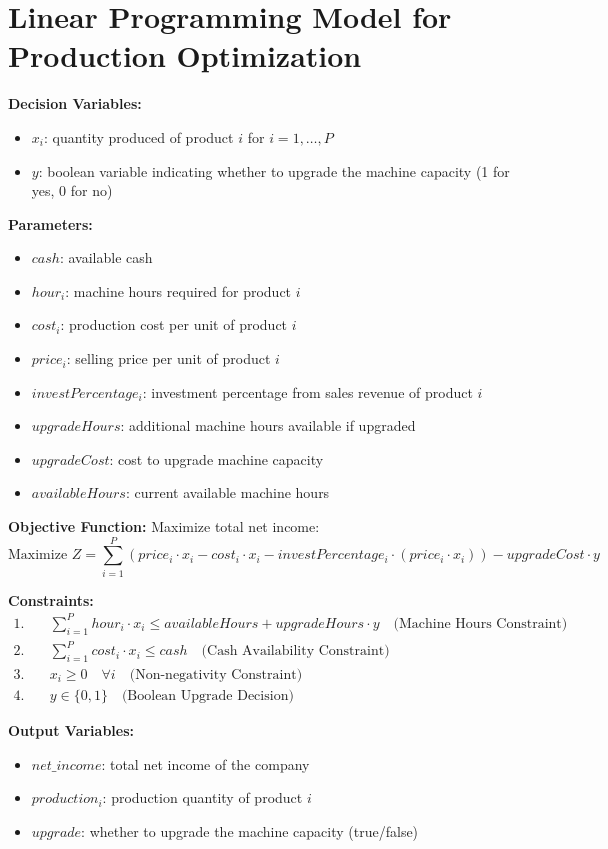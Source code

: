 \documentclass{article}
\begin{document}
\section*{Linear Programming Model for Production Optimization}

\textbf{Decision Variables:}
\begin{itemize}
    \item $x_i$: quantity produced of product $i$ for $i = 1, \ldots, P$
    \item $y$: boolean variable indicating whether to upgrade the machine capacity (1 for yes, 0 for no)
\end{itemize}

\textbf{Parameters:}
\begin{itemize}
    \item $cash$: available cash
    \item $hour_i$: machine hours required for product $i$
    \item $cost_i$: production cost per unit of product $i$
    \item $price_i$: selling price per unit of product $i$
    \item $investPercentage_i$: investment percentage from sales revenue of product $i$
    \item $upgradeHours$: additional machine hours available if upgraded
    \item $upgradeCost$: cost to upgrade machine capacity
    \item $availableHours$: current available machine hours
\end{itemize}

\textbf{Objective Function:}
Maximize total net income:
\[
\text{Maximize } Z = \sum_{i=1}^{P} \left( price_i \cdot x_i - cost_i \cdot x_i - investPercentage_i \cdot (price_i \cdot x_i) \right) - upgradeCost \cdot y
\]

\textbf{Constraints:}
\begin{align*}
1. & \quad \sum_{i=1}^{P} hour_i \cdot x_i \leq availableHours + upgradeHours \cdot y \quad \text{(Machine Hours Constraint)} \\
2. & \quad \sum_{i=1}^{P} cost_i \cdot x_i \leq cash \quad \text{(Cash Availability Constraint)} \\
3. & \quad x_i \geq 0 \quad \forall i \quad \text{(Non-negativity Constraint)} \\
4. & \quad y \in \{0, 1\} \quad \text{(Boolean Upgrade Decision)}
\end{align*}

\textbf{Output Variables:}
\begin{itemize}
    \item $net\_income$: total net income of the company
    \item $production_i$: production quantity of product $i$
    \item $upgrade$: whether to upgrade the machine capacity (true/false)
\end{itemize}
\end{document}

